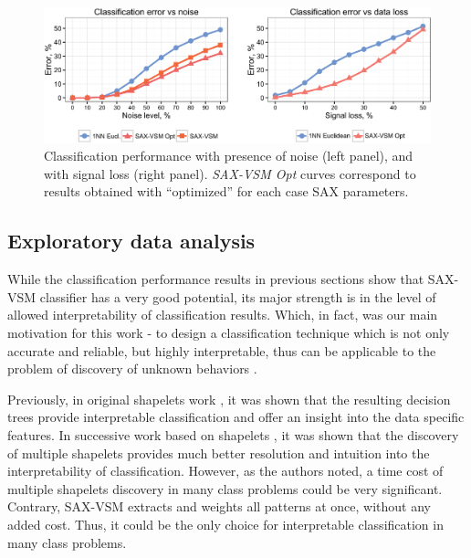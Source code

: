 \documentclass{llncs}
\newcommand{\myfigureshrinker}{\vspace{-1.1cm}}
\begin{document}
\begin{figure}[t]
  \myfigureshrinker
  \centering
  \includegraphics[width=115mm]{figures/corrupted.eps}
  \caption{Classification performance with presence of noise
 (left panel), and with signal loss (right panel). \textit{SAX-VSM Opt} curves correspond to 
 results obtained with ``optimized''  for each case SAX parameters.}
  \label{fig:corrupted}
\end{figure}

\enlargethispage{0.5cm} 
\subsection{Exploratory data analysis}
While the classification performance results in previous sections show that SAX-VSM 
classifier has a very good potential, its major strength is in the level of allowed 
interpretability of classification results. Which, in fact, was our main motivation for this 
work - to design a classification technique which is not only accurate and reliable, but 
highly interpretable, thus can be applicable to the problem of discovery of unknown 
behaviors \cite{android}.

Previously, in original shapelets work \cite{shapelet, logical}, it was shown that the 
resulting decision trees provide interpretable classification and offer an insight into the data
specific features. In successive work based on shapelets \cite{bagnal}, it was shown that
the discovery of multiple shapelets provides much better resolution and intuition into 
the interpretability of classification. 
However, as the authors noted, a time cost of multiple shapelets discovery
in many class problems could be very significant. Contrary, SAX-VSM extracts and weights 
all patterns at once, without any added cost. Thus, it could be the only choice for interpretable 
classification in many class problems.
\end{document}
